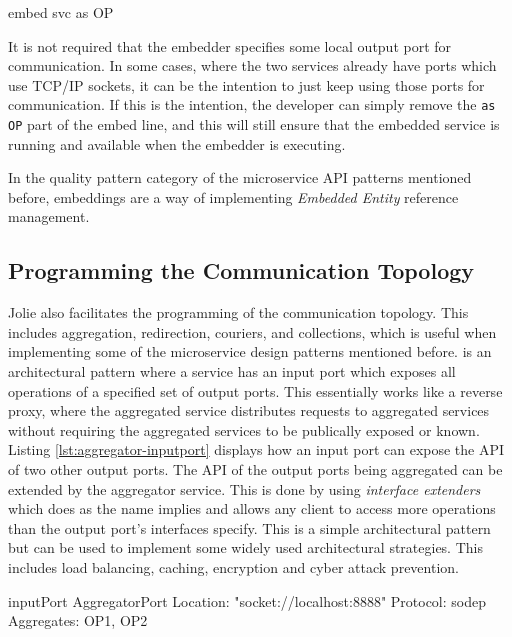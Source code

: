 \begin{jolisting}[][caption={Embedding of a service called "svc" via a local output port "OP"}, label=lst:embed-as]
embed svc as OP
\end{jolisting}

It is not required that the embedder specifies some local output port for communication. In some cases, where the two services already have ports which use TCP/IP sockets,
it can be the intention to just keep using those ports for communication. If this
is the intention, the developer can simply remove the \texttt{as OP} part of the embed line, and this will still ensure that the embedded service is running and available when the embedder is executing.

In the quality pattern category of the microservice API patterns mentioned before, embeddings are a way of implementing \textit{Embedded Entity} reference management.

\subsection{Programming the Communication Topology}
Jolie also facilitates the programming of the communication topology. This includes aggregation, redirection, couriers, and collections, which is useful when 
implementing some of the microservice design patterns mentioned before.
 is an architectural pattern where a service has an input port which exposes all operations of a specified set of output ports. This essentially works like a reverse proxy, where the aggregated service distributes requests to aggregated services without
requiring the aggregated services to be publically exposed or known. Listing \ref{lst:aggregator-inputport} displays how an input port can expose the API of two other output ports.
The API of the output ports being aggregated can be extended by the aggregator service. This is done by using \textit{interface extenders} which does as the name implies and allows any client to access more operations than the output port's interfaces specify.
This is a simple architectural pattern but can be used to implement some widely used architectural strategies. This includes load balancing, caching, encryption and cyber attack prevention.

\begin{jolisting}[][caption={Input port which aggregates requests to some output ports, OP1 and OP2.}, label=lst:aggregator-inputport]
inputPort AggregatorPort {
    Location: "socket://localhost:8888"
    Protocol: sodep
    Aggregates: OP1, OP2
}
\end{jolisting}

